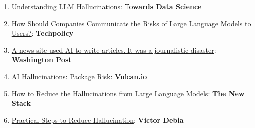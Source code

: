 \documentclass[
]{article}
\providecommand{\tightlist}{%
  \setlength{\itemsep}{0pt}\setlength{\parskip}{0pt}}
\begin{document}
\begin{enumerate}
\def\labelenumi{\arabic{enumi}.}
\tightlist
\item
  \href{https://towardsdatascience.com/llm-hallucinations-ec831dcd7786}{Understanding
  LLM Hallucinations}: \textbf{Towards Data Science}
\item
  \href{https://techpolicy.press/how-should-companies-communicate-the-risks-of-large-language-models-to-users/}{How
  Should Companies Communicate the Risks of Large Language Models to
  Users?}: \textbf{Techpolicy}
\item
  \href{https://www.washingtonpost.com/media/2023/01/17/cnet-ai-articles-journalism-corrections/}{A
  news site used AI to write articles. It was a journalistic disaster}:
  \textbf{Washington Post}
\item
  \href{https://vulcan.io/blog/ai-hallucinations-package-risk}{AI
  Hallucinations: Package Risk}: \textbf{Vulcan.io}
\item
  \href{https://thenewstack.io/how-to-reduce-the-hallucinations-from-large-language-models/}{How
  to Reduce the Hallucinations from Large Language Models}: \textbf{The
  New Stack}
\item
  \href{https://newsletter.victordibia.com/p/practical-steps-to-reduce-hallucination}{Practical
  Steps to Reduce Hallucination}: \textbf{Victor Debia}
\end{enumerate}
\end{document}
